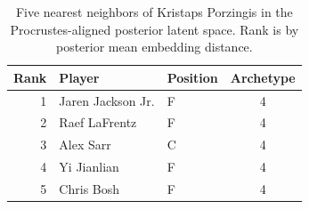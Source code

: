 \begin{table}[htbp]
  \centering\small
  \begin{tabular}{rllc}
    \toprule
    Rank & Player & Position & Archetype \\
    \midrule
    1 & Jaren Jackson Jr. & F & 4 \\
    2 & Raef LaFrentz & F & 4 \\
    3 & Alex Sarr & C & 4 \\
    4 & Yi Jianlian & F & 4 \\
    5 & Chris Bosh & F & 4 \\
    \bottomrule
  \end{tabular}
  \caption{Five nearest neighbors of Kristaps Porzingis in the Procrustes-aligned posterior latent space. Rank is by posterior mean embedding distance.}
  \label{tab:Kristaps_Porzingis_neighbors}
\end{table}

